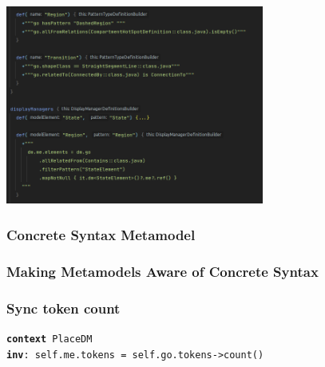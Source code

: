 \begin{frame}
  \frametitle{}
  \centering
  \hspace{-1cm}
  \includegraphics[width=8.5cm]{images/dsl-strings}
\end{frame}

%   

%   

\begin{frame}
  \frametitle{Concrete Syntax Metamodel}
  \hspace{-1cm}
  \centering
  
\end{frame}


\begin{frame}
  \frametitle{Making Metamodels Aware of Concrete Syntax}

  \centering
  \hspace{-1cm}
  
\end{frame}


\begin{frame}
  \frametitle{Sync token count}
  \texttt{\textbf{context} PlaceDM \\
  \textbf{inv}: self.me.tokens = self.go.tokens->count()}

  \centering
  \hspace{-1cm}
  
\end{frame}

